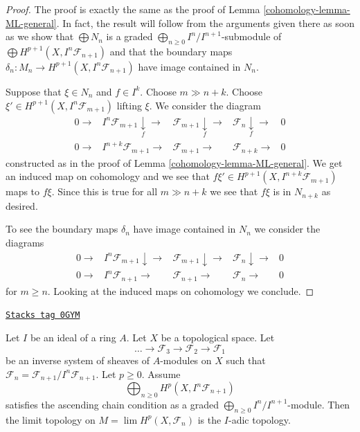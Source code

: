 \begin{proof}

The proof is exactly the same as the proof of Lemma \ref{cohomology-lemma-ML-general}.
In fact, the result will follow from the arguments given there
as soon as we show that
$\bigoplus N_n$ is a graded $\bigoplus_{n \geq 0} I^n/I^{n + 1}$-submodule
of $\bigoplus H^{p + 1}(X, I^n\mathcal{F}_{n + 1})$
and that the boundary maps
$\delta_n : M_n \to H^{p + 1}(X, I^n\mathcal{F}_{n + 1})$
have image contained in $N_n$.

\medskip\noindent
Suppose that $\xi \in N_n$ and $f \in I^k$.
Choose $m \gg n + k$. Choose
$\xi' \in H^{p + 1}(X, I^n\mathcal{F}_{m + 1})$ lifting
$\xi$. We consider the diagram
$$
\begin{array}{ccccc}0 \longrightarrow & I^n\mathcal{F}_{m + 1} \underset{f}{\downarrow}\longrightarrow & \mathcal{F}_{m + 1} \underset{f}{\downarrow}\longrightarrow & \mathcal{F}_n \underset{f}{\downarrow}\longrightarrow & 0 \\ 0 \longrightarrow & I^{n + k}\mathcal{F}_{m + 1} \longrightarrow & \mathcal{F}_{m + 1} \longrightarrow & \mathcal{F}_{n + k} \longrightarrow & 0\end{array}
$$
constructed as in the proof of Lemma \ref{cohomology-lemma-ML-general}.
We get an induced map on cohomology and we see that
$f \xi' \in H^{p + 1}(X, I^{n + k}\mathcal{F}_{m + 1})$
maps to $f \xi$. Since this is true for all $m \gg n + k$
we see that $f\xi$ is in $N_{n + k}$ as desired.

\medskip\noindent
To see the boundary maps $\delta_n$ have image contained in $N_n$
we consider the diagrams
$$
\begin{array}{ccccc}0 \longrightarrow & I^n\mathcal{F}_{m + 1} \downarrow\longrightarrow & \mathcal{F}_{m + 1} \downarrow\longrightarrow & \mathcal{F}_n \downarrow\longrightarrow & 0 \\ 0 \longrightarrow & I^n\mathcal{F}_{n + 1} \longrightarrow & \mathcal{F}_{n + 1} \longrightarrow & \mathcal{F}_n \longrightarrow & 0\end{array}
$$
for $m \geq n$. Looking at the induced maps on cohomology we conclude.
\end{proof}

\begin{lemma}
\label{cohomology-lemma-topology-I-adic-general}
\href{https://stacks.math.columbia.edu/tag/0GYM}{\texttt{Stacks tag 0GYM}}

Let $I$ be an ideal of a ring $A$. Let $X$ be a topological space. Let
$$
\ldots \to \mathcal{F}_3 \to \mathcal{F}_2 \to \mathcal{F}_1
$$
be an inverse system of sheaves of $A$-modules on $X$ such that
$\mathcal{F}_n = \mathcal{F}_{n + 1}/I^n\mathcal{F}_{n + 1}$.
Let $p \geq 0$. Assume
$$
\bigoplus\nolimits_{n \geq 0} H^p(X, I^n\mathcal{F}_{n + 1})
$$
satisfies the ascending chain condition as a graded
$\bigoplus_{n \geq 0} I^n/I^{n + 1}$-module.
Then the limit topology on $M = \lim H^p(X, \mathcal{F}_n)$
is the $I$-adic topology.
\end{lemma}


